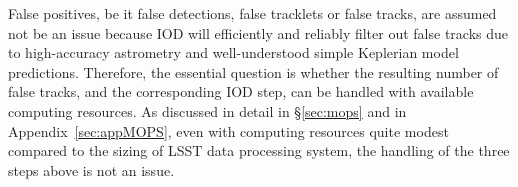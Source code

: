False positives, be it false detections, false tracklets or false tracks, are assumed not be
an issue because IOD will efficiently and reliably filter out false tracks due to high-accuracy
astrometry and well-understood simple Keplerian model predictions. Therefore, the
essential question is whether the resulting number of false tracks, and the corresponding
IOD step, can be handled with available computing resources. As discussed in detail in \S\ref{sec:mops}
and in Appendix~\ref{sec:appMOPS}, even with computing resources quite modest compared to the
sizing of LSST data processing system, the handling of the three steps above is not an issue.
